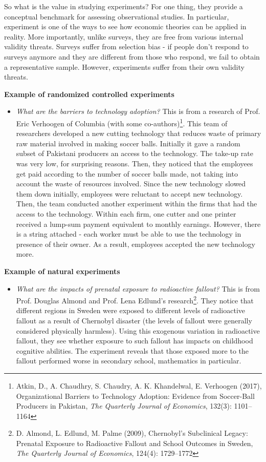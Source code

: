 So what is the value in studying experiments? For one thing, they provide a conceptual benchmark for assessing observational studies. In particular, experiment is one of the ways to see how economic theories can be applied in reality. More importantly, unlike surveys, they are free from various internal validity threats. Surveys suffer from selection bias - if people don't respond to surveys anymore and they are different from those who respond, we fail to obtain a representative sample. However, experiments suffer from their own validity threats. 
\begin{mdframed}[backgroundcolor =blue!10]
\textbf{Example of randomized controlled experiments}
\begin{itemize}
\item \textit{What are the barriers to technology adoption?} This is from a research of Prof. Eric Verhoogen of Columbia (with some co-authors)\footnote{\scriptsize{Atkin, D., A. Chaudhry, S. Chaudry, A. K. Khandelwal, E. Verhoogen (2017), Organizational Barriers to Technology Adoption: Evidence from Soccer-Ball Producers in Pakistan, \textit{The Quarterly Journal of Economics}, 132(3): 1101–1164}}. This team of researchers developed a new cutting technology that reduces waste of primary raw material involved in making soccer balls. Initially it gave a random subset of Pakistani producers an access to the technology. The take-up rate was very low, for surprising reasons. Then, they noticed that the employees get paid according to the number of soccer balls made, not taking into account the waste of resources involved. Since the new technology slowed them down initially, employees were reluctant to accept new technology. Then, the team conducted another experiment within the firms that had the access to the technology. Within each firm, one cutter and one printer received a lump-sum payment equivalent to monthly earnings. However, there is a string attached - each worker must be able to use the technology in presence of their owner. As a result, employees accepted the new technology more. \par\medskip
\noindent
\end{itemize}
\textbf{Example of natural experiments}
\begin{itemize}
\item \textit{What are the impacts of prenatal exposure to radioactive fallout?} This is from Prof. Douglas Almond and Prof. Lena Edlund's research\footnote{\scriptsize{D. Almond, L. Edlund, M. Palme (2009), Chernobyl's Subclinical Legacy: Prenatal Exposure to Radioactive Fallout and School Outcomes in Sweden, \textit{The Quarterly Journal of Economics}, 124(4): 1729–1772}}. They notice that different regions in Sweden were exposed to different levels of radioactive fallout as a result of Chernobyl disaster (the levels of fallout were generally considered physically harmless). Using this exogenous variation in radioactive fallout, they see whether exposure to such fallout has impacts on childhood cognitive abilities. The experiment reveals that those exposed more to the fallout performed worse in secondary school, mathematics in particular.  

\end{itemize}
\end{mdframed}
